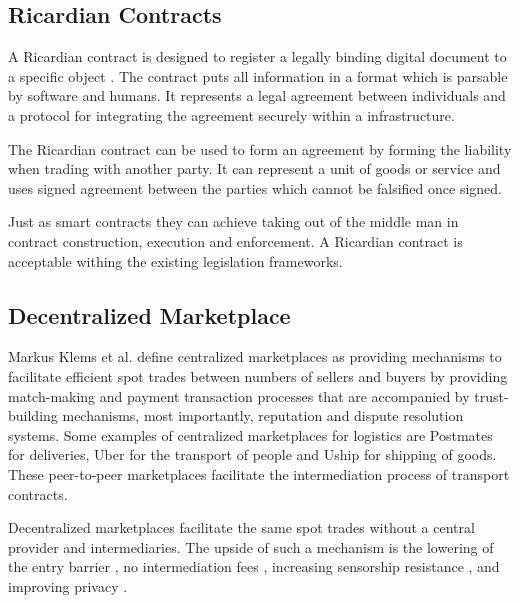 \subsection{Ricardian Contracts}

A Ricardian contract is designed to register a legally binding digital document to a specific object \cite{grigg2004ricardian}. The contract puts all information in a format which is parsable by software and humans. It represents a legal agreement between individuals and a protocol for integrating the agreement securely within a infrastructure. \par
The Ricardian contract can be used to form an agreement by forming the liability when trading with another party. It can represent a unit of goods or service and uses signed agreement between the parties which cannot be falsified once signed. \par
Just as smart contracts \cite{sc} they can achieve taking out of the middle man in contract construction, execution and enforcement. A Ricardian contract is acceptable withing the existing legislation frameworks.


\subsection{Decentralized Marketplace}

Markus Klems et al. define centralized marketplaces\cite{trustlessIntermediationInBCServiceMarket} as providing mechanisms to facilitate efficient spot trades between numbers of sellers and buyers by providing match-making and payment transaction processes that are accompanied by trust-building mechanisms, most importantly, reputation and dispute resolution systems. Some examples of centralized marketplaces for logistics are Postmates for deliveries, Uber for the transport of people and Uship for shipping of goods. These peer-to-peer marketplaces facilitate the intermediation process of transport contracts.\par
Decentralized marketplaces facilitate the same spot trades without a central provider and intermediaries. The upside of such a mechanism is the lowering of the entry barrier \cite{einav2016peer}, no intermediation fees \cite{openbazaar}, increasing sensorship resistance \cite{decentralMarket}, and improving privacy \cite{decentralizedAnonymousReputation}.

